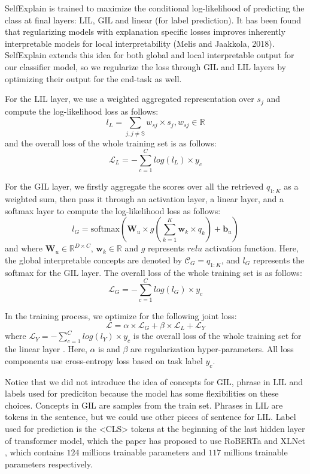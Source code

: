 \documentclass{article}
\begin{document}
SelfExplain is trained to maximize the conditional log-likelihood of predicting the class at final layers: LIL, GIL and linear (for label prediction). It has been found that regularizing models with explanation specific losses improves inherently interpretable models for local interpretability (Melis and Jaakkola,
2018). SelfExplain extends this idea for both global and local interpretable output for our classifier model, so we regularize the loss through GIL and LIL layers by optimizing their output for the end-task as well. 

For the LIL layer, we use a weighted aggregated representation over $s_j$ and compute the log-likelihood loss as follows:
$$l_L = \sum_{j, j \neq \mathbb{S}}{w_{sj} \times s_j}, w_{sj} \in \mathbb{R}$$
and the overall loss of the whole training set is as follows:
$$\mathcal{L}_L = - \sum_{c=1}^{C}{log(l_L)} \times {y_c}$$

For the GIL layer, we firstly aggregate the scores over all the retrieved $q_{1:K}$ as a weighted sum, then pass it through an activation layer, a linear layer, and a softmax layer to compute the log-likelihood loss as follows:
$$l_G = \textrm{softmax}(\mathbf{W}_u \times g(\sum_{k=1}^{K}{\mathbf{w}_k \times q_k}) + \textbf{b}_u)$$
and where $\mathbf{W}_u \in \mathbb{R}^{D \times C}$, $\mathbf{w}_k \in \mathbb{R}$ and $g$ represents $relu$ activation function. Here, the global interpretable concepts are denoted by $\mathcal{C}_G = q_{1:K}$, and $l_G$ represents the softmax for the GIL layer. The overall loss of the whole training set is as follows:
$$\mathcal{L}_G = - \sum_{c=1}^{C}{log(l_G)} \times {y_c}$$

In the training process, we optimize for the following joint loss:
$$\mathcal{L} = \alpha \times \mathcal{L}_G + \beta \times \mathcal{L}_L + \mathcal{L}_Y$$ 
where $\mathcal{L}_Y = - \sum_{c=1}^{C}{log(l_Y)} \times {y_c}$ is the overall loss of the whole training set for the linear layer . Here, $\alpha$ is and $\beta$ are regularization hyper-parameters. All loss components use cross-entropy loss based on task label $y_c$.

Notice that we did not introduce the idea of concepts for GIL, phrase in LIL and labels used for 
prediciton because the model has some flexibilities on these choices. Concepts in GIL are samples from 
the train set. Phrases in LIL are tokens in the sentence, but we could use other pieces of sentence 
for LIL. Label used for prediction is the <CLS> tokens at the beginning of the last hidden layer of 
transformer model, which the paper has proposed to use RoBERTa \cite{DBLP:journals/corr/abs-1907-11692} 
and XLNet \cite{DBLP:journals/corr/abs-1906-08237}, which contains $124$ millions trainable parameters 
and $117$ millions trainable parameters respectively. 
\end{document}
